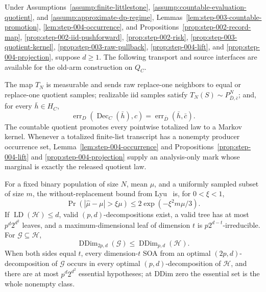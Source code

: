 \begin{proposition}\label{prop:step-015-interfaces}
Under Assumptions~\ref{assump:finite-littlestone},
\ref{assump:countable-evaluation-quotient}, and
\ref{assump:approximate-dp-regime},
Lemmas~\ref{lem:step-003-countable-promotion},
\ref{lem:step-004-occurrence}, and
Propositions~\ref{prop:step-002-record-map},
\ref{prop:step-002-iid-pushforward},
\ref{prop:step-002-risk},
\ref{prop:step-003-quotient-kernel},
\ref{prop:step-003-raw-pullback},
\ref{prop:step-004-lift}, and
\ref{prop:step-004-projection}, suppose \(d\ge1\). The following
transport and source interfaces are available for the old-arm
construction on \(Q_C\).

The map \(T_N\) is measurable and sends raw replace-one neighbors to equal
or replace-one quotient samples; realizable iid samples satisfy
\(T_N(S)\sim P_{\bar D,\bar c}^N\); and, for every \(\bar h\in H_C\),
\[
 \operatorname{err}_D(\operatorname{Dec}_C(\bar h),c)
 =\operatorname{err}_{\bar D}(\bar h,\bar c).
 \tag{D1}
\]
The countable quotient promotes every pointwise totalized law to a Markov
kernel. Whenever a totalized finite-list transcript has a nonempty producer
occurrence set, Lemma~\ref{lem:step-004-occurrence} and
Propositions~\ref{prop:step-004-lift} and
\ref{prop:step-004-projection} supply an analysis-only mark whose marginal is
exactly the released quotient law.

For a fixed binary population of size \(N\), mean \(\mu\), and a uniformly
sampled subset of size \(m\), the without-replacement bound from
Lyu~\citep{lyu2025} is, for \(0<\xi<1\),
\[
 \Pr(|\widehat\mu-\mu|>\xi\mu)
 \le2\exp(-\xi^2m\mu/3).
 \tag{C1}
\]
If \(\operatorname{LD}(\mathcal H)\le d\), valid \((p,d)\)-decompositions
exist, a valid tree has at most \(p^d2^{d^2}\) leaves, and a
maximum-dimensional leaf of dimension \(t\) is
\(p2^{d-t}\)-irreducible.  For \(\mathcal G\subseteq\mathcal H\),
\[
 \operatorname{DDim}_{2p,d}(\mathcal G)
 \le\operatorname{DDim}_{p,d}(\mathcal H).
 \tag{C2}
\]
When both sides equal \(t\), every dimension-\(t\) SOA from an optimal
\((2p,d)\)-decomposition of \(\mathcal G\) occurs in every optimal
\((p,d)\)-decomposition of \(\mathcal H\), and there are at most
\(p^d2^{d^2}\) essential hypotheses; at DDim zero the essential set is the
whole nonempty class.


\end{proposition}

